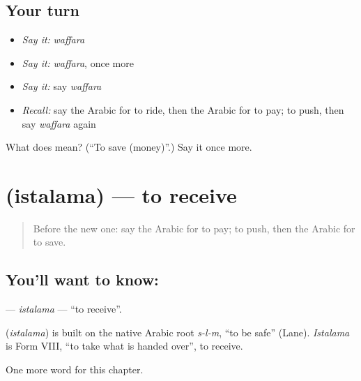 \subsection*{Your turn}
\begin{itemize}
\raggedright
  \item \emph{Say it:} \emph{waffara}
  \item \emph{Say it:} \emph{waffara}, once more
  \item \emph{Say it:} say \emph{waffara}
  \item \emph{Recall:} say the Arabic for to ride, then the Arabic for to pay; to push, then say \emph{waffara} again
\end{itemize}

\begin{tcolorbox}[breakable,colback=teal!4,colframe=teal!35!black,title={Before you move on}]
What does  mean? (\textquotedblleft{}To save (money)\textquotedblright{}.) Say it once more.
\end{tcolorbox}
\section[\texorpdfstring{\ar{استلم} (istalama)}{استلم (istalama)}]{ (istalama) — to receive}

\label{lesson:AR-C192-istalama}



\begin{quote}
Before the new one: say the Arabic for to pay; to push, then the Arabic for to save.
\end{quote}

\subsection*{You'll want to know: }
\textbf{} — \emph{istalama} — \textquotedblleft{}to receive\textquotedblright{}.

\begin{cousinweb}
\textbf{} (\emph{istalama}) is built on the native Arabic root \emph{s-l-m}, \textquotedblleft{}to be safe\textquotedblright{} (Lane). \emph{Istalama} is Form VIII, \textquotedblleft{}to take what is handed over\textquotedblright{}, to receive.
\end{cousinweb}

\begin{grammarlens}[title={What you've built}]
One more word for this chapter.
\end{grammarlens}

